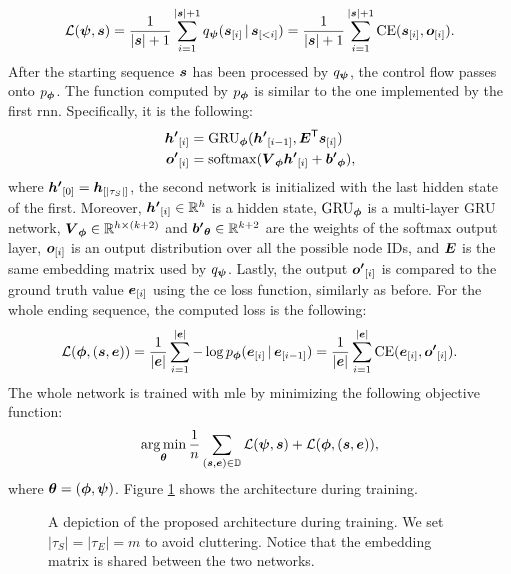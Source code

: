 $$\Loss(\EncParam, \Vector{s}) = \frac{1}{|\Vector{s}|+1} \sum_{i=1}^{|\Vector{s}|+1} q_{\EncParam}(\Elem{s}{i} \given \Elem{s}{<i}) = \frac{1}{|\Vector{s}|+1} \sum_{i=1}^{|\Vector{s}|+1} \mathrm{CE}(\Elem{s}{i}, \Elem{o}{i}).$$
After the starting sequence $\Vector{s}$ has been processed by $q_{\boldsymbol{\psi}}$, the control flow passes onto $p_{\boldsymbol{\phi}}$. The function computed by $p_{\boldsymbol{\phi}}$ is similar to the one implemented by the first \gls{rnn}. Specifically, it is the following:
\begin{align*}
    \Elem{h'}{i} &= \Op{GRU}_{\DecParam}(\Elem{h'}{i-1}, \Matrix{E}^{\Transpose}\Elem{s}{i})\\
    \Elem{o'}{i} &= \softmax(\Matrix{V}_{\DecParam}\Elem{h'}{i} + \Vector{b'}_{\DecParam}),
\end{align*}
where $\Elem{h'}{0} = \Elem{h}{|\tau_S|}$, \ie the second network is initialized with the last hidden state of the first. Moreover, $\Elem{h'}{i} \in \Real^h$ is a hidden state, $\operatorname{GRU}_{\boldsymbol{\phi}}$ is a multi-layer GRU network, $\Matrix{V}_{\DecParam} \in \Real^{h \times (k+2)}$ and $\Vector{b'}_{\Param} \in \Real^{k+2}$ are the weights of the softmax output layer, $\Elem{o}{i}$ is an output distribution over all the possible node IDs, and $\Matrix{E}$ is the same embedding matrix used by $q_{\boldsymbol{\psi}}$.  Lastly, the output $\Elem{o'}{i}$ is compared to the ground truth value $\Elem{e}{i}$ using the \gls{ce} loss function, similarly as before. For the whole ending sequence, the computed loss is the following:
$$\Loss(\DecParam, (\Vector{s}, \Vector{e})) = \frac{1}{|\Vector{e}|} \sum_{i=1}^{|\Vector{e}|} - \log p_{\DecParam}(\Elem{e}{i} \given \Elem{e}{i-1}) = \frac{1}{|\Vector{e}|} \sum_{i=1}^{|\Vector{e}|} \mathrm{CE}(\Elem{e}{i}, \Elem{o'}{i}).$$
The whole network is trained with \gls{mle} by minimizing the following objective function:
$$\argmin_{\Param} \frac{1}{n} \sum_{(\Vector{s},\Vector{e}) \in \Data} \Loss(\EncParam, \Vector{s}) + \Loss(\DecParam, (\Vector{s}, \Vector{e})),$$
where $\boldsymbol{\theta} = (\boldsymbol{\phi}, \boldsymbol{\psi})$. Figure \ref{fig:model-training} shows the architecture during training.

\begin{figure}[h!]
    \centering
    \resizebox{.8\textwidth}{!}{}
    \caption{A depiction of the proposed architecture during training. We set $|\tau_S| = |\tau_E| = m$ to avoid cluttering. Notice that the embedding matrix is shared between the two networks.}
    \label{fig:model-training}
\end{figure}

